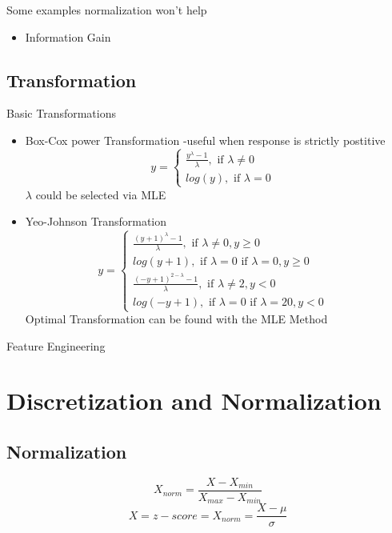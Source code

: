 \documentclass[11pt, openany]{book}              %
\begin{document}
Some examples normalization won't help

\begin{itemize}
	\item Information Gain
\end{itemize}

\subsection{Transformation}

Basic Transformations

\begin{itemize}
    \item Box-Cox power Transformation -useful when response is strictly postitive
    $$y = \left\{
             \begin{array}{lr}
             \frac{y^\lambda -1}{\lambda}, \text{ if }\lambda \neq 0 &  \\
             log(y), \text{ if }\lambda = 0 &  
             \end{array}
      \right.$$
      $\lambda$ could be selected via MLE
    \item Yeo-Johnson Transformation
     $$y = \left\{
             \begin{array}{lr}
             \frac{(y+1)^\lambda -1}{\lambda}, \text{ if }\lambda \neq 0, y \geq 0 &  \\
             log(y+1), \text{ if }\lambda = 0 \text{ if }\lambda = 0, y \geq 0 &  \\
              \frac{(-y+1)^{2-\lambda} -1}{\lambda}, \text{ if }\lambda \neq 2, y < 0 &  \\
				log(-y+1), \text{ if }\lambda = 0 \text{ if }\lambda =2 0, y < 0 & 
			  
             \end{array}
      \right.$$ Optimal Transformation can be found with the MLE Method
\end{itemize}

Feature Engineering
\section{Discretization and Normalization}

\subsection{Normalization}

$$ X_{norm} = \frac{X -  X_{min}}{X_{max} - X_{min}}$$
$$ X = z-score = X_{norm} = \frac{X - \mu}{\sigma}$$
\end{document}
